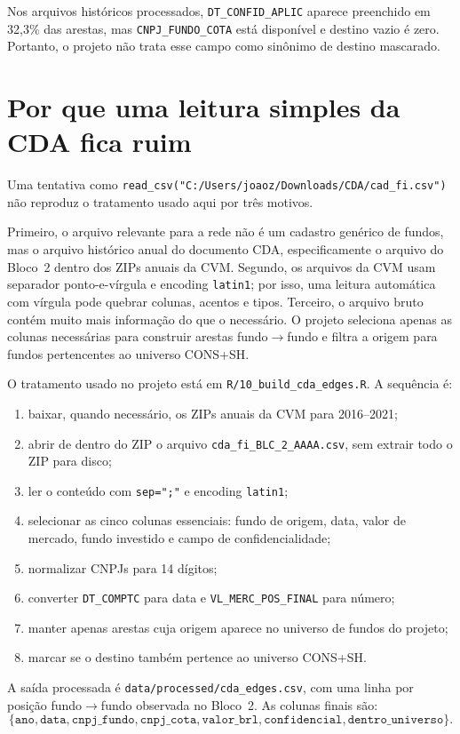 \documentclass[12pt,a4paper]{report}
\begin{document}
Nos arquivos históricos processados, \texttt{DT\_CONFID\_APLIC} aparece preenchido em 32,3\% das arestas,
mas \texttt{CNPJ\_FUNDO\_COTA} está disponível e destino vazio é zero. Portanto, o projeto não trata esse
campo como sinônimo de destino mascarado.

\section{Por que uma leitura simples da CDA fica ruim}

Uma tentativa como \texttt{read\_csv("C:/Users/joaoz/Downloads/CDA/cad\_fi.csv")} não reproduz o tratamento
usado aqui por três motivos.

Primeiro, o arquivo relevante para a rede não é um cadastro genérico de fundos, mas o arquivo histórico
anual do documento CDA, especificamente o arquivo do Bloco~2 dentro dos ZIPs anuais da CVM. Segundo, os
arquivos da CVM usam separador ponto-e-vírgula e encoding
\texttt{latin1}; por isso, uma leitura automática com vírgula pode quebrar colunas, acentos e tipos. Terceiro,
o arquivo bruto contém muito mais informação do que o necessário. O projeto seleciona apenas as colunas
necessárias para construir arestas fundo$\to$fundo e filtra a origem para fundos pertencentes ao universo
CONS+SH.

O tratamento usado no projeto está em \texttt{R/10\_build\_cda\_edges.R}. A sequência é:
\begin{enumerate}
\item baixar, quando necessário, os ZIPs anuais da CVM para 2016--2021;
\item abrir de dentro do ZIP o arquivo \texttt{cda\_fi\_BLC\_2\_AAAA.csv}, sem extrair todo o ZIP para disco;
\item ler o conteúdo com \texttt{sep=";"} e encoding \texttt{latin1};
\item selecionar as cinco colunas essenciais: fundo de origem, data, valor de mercado, fundo investido e
campo de confidencialidade;
\item normalizar CNPJs para 14 dígitos;
\item converter \texttt{DT\_COMPTC} para data e \texttt{VL\_MERC\_POS\_FINAL} para número;
\item manter apenas arestas cuja origem aparece no universo de fundos do projeto;
\item marcar se o destino também pertence ao universo CONS+SH.
\end{enumerate}

A saída processada é \texttt{data/processed/cda\_edges.csv}, com uma linha por posição fundo$\to$fundo
observada no Bloco~2. As colunas finais são:
\[
\{\texttt{ano},\texttt{data},\texttt{cnpj\_fundo},\texttt{cnpj\_cota},\texttt{valor\_brl},
\texttt{confidencial},\texttt{dentro\_universo}\}.
\]
\end{document}
